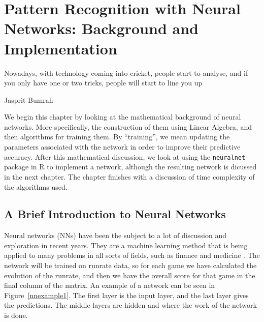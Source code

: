 \chapter{Pattern Recognition with Neural Networks: Background and Implementation}

\epigraph{Nowadays, with technology coming into cricket, people start to analyse, and if you only have one or two tricks, people will start to line you up}{Jasprit Bumrah}

We begin this chapter by looking at the mathematical background of neural networks. More specifically, the construction of them using Linear Algebra, and then algorithms 
for training them. By ``training'', we mean updating the parameters associated with the network in order to improve their predictive accuracy. After this mathematical discussion, 
we look at using the \verb|neuralnet| package in R to implement a network, although the resulting network is dicussed in the next chapter. The chapter finishes with a discussion of 
time complexity of the algorithms used.


\section{A Brief Introduction to Neural Networks}
Neural networks (NNs) have been the subject to a lot of discussion and exploration in recent years. They are a machine learning method that is being applied to many problems
in all sorts of fields, such as finance \cite{nnstock} and medicine \cite{nncancer}.  
The network will be trained on runrate data, so for each game we have calculated the evolution of the runrate,
and then we have the overall score for that game in the final column of the matrix. An example of a network can be seen in Figure~\ref{nnexample1}. The first layer is the 
input layer, and the last layer gives the predictions. The middle layers are hidden and where the work of the network is done. \\

